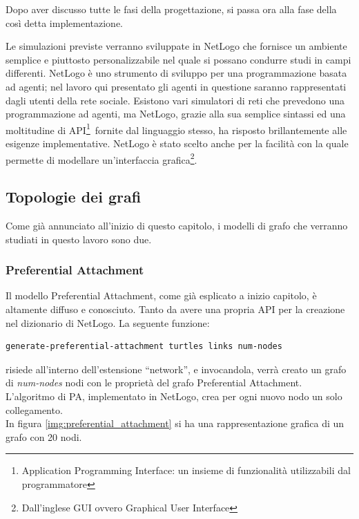 Dopo aver discusso tutte le fasi della progettazione, si passa ora alla fase della così detta implementazione.

Le simulazioni previste verranno sviluppate in NetLogo che fornisce un ambiente semplice e piuttosto 
personalizzabile nel quale si possano condurre studi in campi differenti.
NetLogo è uno strumento di sviluppo per una programmazione basata ad agenti;
nel lavoro qui presentato gli agenti in questione saranno rappresentati dagli utenti della rete sociale.
Esistono vari simulatori di reti che prevedono una programmazione ad agenti, ma NetLogo,
grazie alla sua semplice sintassi ed una moltitudine di
API\footnote{\scriptsize Application Programming Interface: un insieme di funzionalità utilizzabili dal programmatore
}~\cite{biblio:netlogo_dictionary}fornite dal linguaggio stesso, ha risposto brillantemente alle esigenze implementative. 
NetLogo è stato scelto anche per la facilità con la quale permette di modellare 
un'interfaccia grafica\footnote{\scriptsize Dall’inglese GUI ovvero Graphical User Interface}.



\subsection{Topologie dei grafi}
\label{section:graph_topologies}


Come già annunciato all'inizio di questo capitolo, i modelli di grafo che verranno studiati in questo lavoro
sono due.


\subsubsection{Preferential Attachment}
\label{section:graph_topologies_pa}
Il modello Preferential Attachment, come già esplicato a inizio capitolo, è altamente diffuso e conosciuto.
Tanto da avere una propria API per la creazione nel dizionario di NetLogo. 
La seguente funzione:
\begin{lstlisting}[label=some-code, style=custom_code]
 generate-preferential-attachment turtles links num-nodes
\end{lstlisting}
risiede all'interno dell'estensione ``network'', e invocandola, verrà creato un grafo di \emph{num-nodes} nodi con le proprietà 
del grafo Preferential Attachment. L'algoritmo di PA, implementato in NetLogo, crea per ogni nuovo nodo un solo collegamento. \\
In figura \ref{img:preferential_attachment} si ha una rappresentazione grafica di un grafo con 20 nodi.

